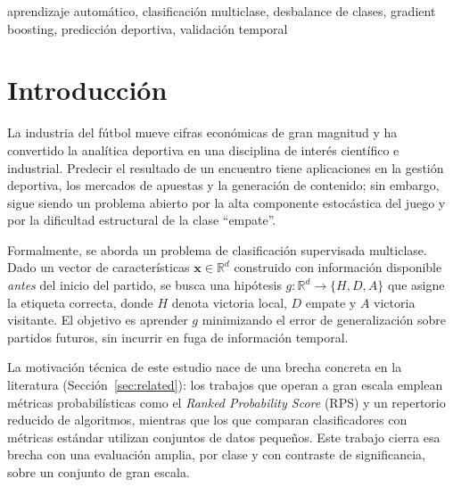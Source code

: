 \documentclass[conference]{IEEEtran}
\begin{document}
\begin{IEEEkeywords}
aprendizaje autom\'atico, clasificaci\'on multiclase, desbalance de clases,
gradient boosting, predicci\'on deportiva, validaci\'on temporal
\end{IEEEkeywords}

\section{Introducci\'on}
La industria del f\'utbol mueve cifras econ\'omicas de gran magnitud y ha convertido la
anal\'itica deportiva en una disciplina de inter\'es cient\'ifico e industrial. Predecir
el resultado de un encuentro tiene aplicaciones en la gesti\'on deportiva, los mercados de
apuestas y la generaci\'on de contenido; sin embargo, sigue siendo un problema abierto por
la alta componente estoc\'astica del juego y por la dificultad estructural de la clase
``empate''.

Formalmente, se aborda un problema de clasificaci\'on supervisada multiclase. Dado un
vector de caracter\'isticas $\mathbf{x}\in\mathbb{R}^{d}$ construido con informaci\'on
disponible \emph{antes} del inicio del partido, se busca una hip\'otesis
$g:\mathbb{R}^{d}\rightarrow\{H,D,A\}$ que asigne la etiqueta correcta, donde $H$ denota
victoria local, $D$ empate y $A$ victoria visitante. El objetivo es aprender $g$
minimizando el error de generalizaci\'on sobre partidos futuros, sin incurrir en fuga de
informaci\'on temporal.

La motivaci\'on t\'ecnica de este estudio nace de una brecha concreta en la literatura
(Secci\'on~\ref{sec:related}): los trabajos que operan a gran escala emplean m\'etricas
probabil\'isticas como el \emph{Ranked Probability Score} (RPS) y un repertorio reducido de
algoritmos, mientras que los que comparan clasificadores con m\'etricas est\'andar utilizan
conjuntos de datos peque\~nos. Este trabajo cierra esa brecha con una evaluaci\'on amplia,
por clase y con contraste de significancia, sobre un conjunto de gran escala.
\end{document}
